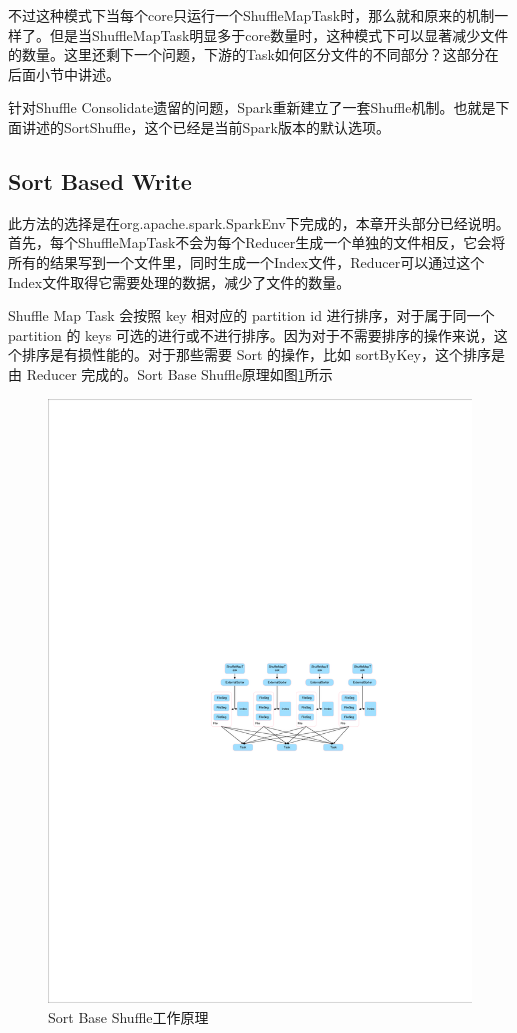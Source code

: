 不过这种模式下当每个core只运行一个ShuffleMapTask时，那么就和原来的机制一样了。但是当ShuffleMapTask明显多于core数量时，这种模式下可以显著减少文件的数量。这里还剩下一个问题，下游的Task如何区分文件的不同部分？这部分在后面小节中讲述。

针对Shuffle Consolidate遗留的问题，Spark重新建立了一套Shuffle机制。也就是下面讲述的SortShuffle，这个已经是当前Spark版本的默认选项。
\subsection{Sort Based Write}
此方法的选择是在org.apache.spark.SparkEnv下完成的，本章开头部分已经说明。首先，每个ShuffleMapTask不会为每个Reducer生成一个单独的文件相反，它会将所有的结果写到一个文件里，同时生成一个Index文件，Reducer可以通过这个Index文件取得它需要处理的数据，减少了文件的数量。

Shuffle Map Task 会按照 key 相对应的 partition id 进行排序，对于属于同一个 partition 的 keys 可选的进行或不进行排序。因为对于不需要排序的操作来说，这个排序是有损性能的。对于那些需要 Sort 的操作，比如 sortByKey，这个排序是由 Reducer 完成的。Sort Base Shuffle原理如图\ref{fig:sortshuffle}所示
\begin{figure}[H] 
	\centering
	\includegraphics[width=\textwidth]{figures/sortshuffle.pdf}
	\caption{Sort Base Shuffle工作原理}
	\label{fig:sortshuffle}
\end{figure}

